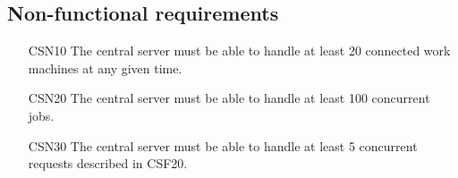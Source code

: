 \subsection{Non-functional requirements}
\begin{enumerate}
  \item[CSN10] The central server must be able to handle at least 20 connected work machines at any given time.
  \item[CSN20] The central server must be able to handle at least 100 concurrent jobs.
  \item[CSN30] The central server must be able to handle at least 5 concurrent requests described in CSF20.
\end{enumerate}

